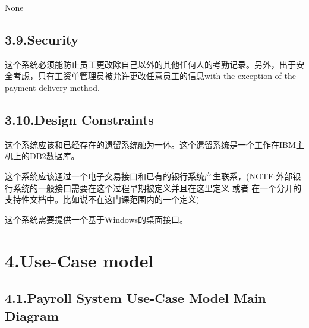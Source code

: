 \documentclass{article}
\begin{document}
\noindent{}None%

\subsection{3.9.\hspace*{0.5em}Security}\label{sec-security}%

\noindent{}这个系统必须能防止员工更改除自己以外的其他任何人的考勤记录。另外，出于安全考虑，只有工资单管理员被允许更改任意员工的信息with the exception of the payment delivery method.%

\subsection{3.10.\hspace*{0.5em}Design Constraints}\label{sec-design-constraints}%

\noindent{}这个系统应该和已经存在的遗留系统融为一体。这个遗留系统是一个工作在IBM主机上的DB2数据库。%

这个系统应该通过一个电子交易接口和已有的银行系统产生联系，(NOTE:外部银行系统的一般接口需要在这个过程早期被定义并且在这里定义 或者 在一个分开的支持性文档中。比如说不在这门课范围内的一个定义)%

这个系统需要提供一个基于Windows的桌面接口。%

\section{4.\hspace*{0.5em}Use-Case model}\label{sec-use-case-model}%

\subsection{4.1.\hspace*{0.5em}Payroll System Use-Case Model Main Diagram}\label{sec-payroll-system-use-case-model-main-diagram}%
\end{document}
